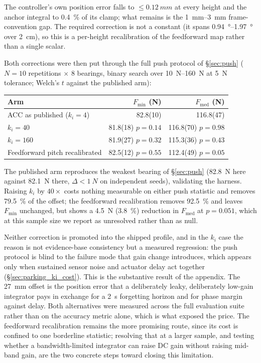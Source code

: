 \documentclass[conference]{IEEEtran}
\begin{document}
The controller's own position error falls to ${\leq}\SI{0.12}{mm}$ at every
height and the anchor integral to \SI{0.4}{\percent} of its clamp; what remains
is the \SIrange{1}{3}{mm} frame-convention gap. The required correction is not
a constant (it spans \SIrange{0.94}{1.97}{\degree} over \SI{2}{cm}), so this is
a per-height recalibration of the feedforward map rather than a single scalar.

Both corrections were then put through the full push protocol of
\S\ref{sec:push} ($N{=}10$ repetitions $\times$ 8 bearings, binary search over
\SIrange{10}{160}{N} at \SI{5}{N} tolerance; Welch's $t$ against the published
arm):

\begin{center}\footnotesize
\begin{tabular}{lrr}
\hline
Arm & $F_{\min}$ (N) & $F_{\text{med}}$ (N) \\
\hline
ACC as published ($k_i{=}4$) & 82.8(10) & 116.8(47) \\
$k_i{=}40$ & 81.8(18)\,\,$p{=}0.14$ & 116.8(70)\,\,$p{=}0.98$ \\
$k_i{=}160$ & 81.9(27)\,\,$p{=}0.32$ & 115.3(36)\,\,$p{=}0.43$ \\
Feedforward pitch recalibrated & 82.5(12)\,\,$p{=}0.55$ & 112.4(49)\,\,$p{=}0.05$ \\
\hline
\end{tabular}
\end{center}

The published arm reproduces the weakest bearing of \S\ref{sec:push}
(\SI{82.8}{N} here against \SI{82.1}{N} there, $\Delta{<}\SI{1}{N}$ on
independent seeds), validating the harness. Raising $k_i$ by $40{\times}$
costs nothing measurable on either push statistic and removes \SI{79.5}{\percent}
of the offset; the feedforward recalibration removes \SI{92.5}{\percent} and
leaves $F_{\min}$ unchanged, but shows a \SI{4.5}{N} (\SI{3.8}{\percent})
reduction in $F_{\text{med}}$ at $p{=}0.051$, which at this sample size we
report as unresolved rather than as null.

Neither correction is promoted into the shipped profile, and in the $k_i$ case
the reason is not evidence-base consistency but a measured regression: the
push protocol is blind to the failure mode that gain change introduces, which
appears only when sustained sensor noise and actuator delay act together
(\S\ref{sec:parking_ki_cost}). This is the substantive result of the appendix.
The \SI{27}{mm} offset is the position error that a deliberately leaky,
deliberately low-gain integrator pays in exchange for a \SI{2}{s}
forgetting horizon and for phase margin against delay. Both alternatives were
measured across the full evaluation suite rather than on the accuracy metric
alone, which is what exposed the price. The feedforward recalibration remains
the more promising route, since its cost is confined to one borderline
statistic; resolving that at a larger sample, and testing whether a
bandwidth-limited integrator can raise DC gain without raising mid-band gain,
are the two concrete steps toward closing this limitation.
\end{document}
